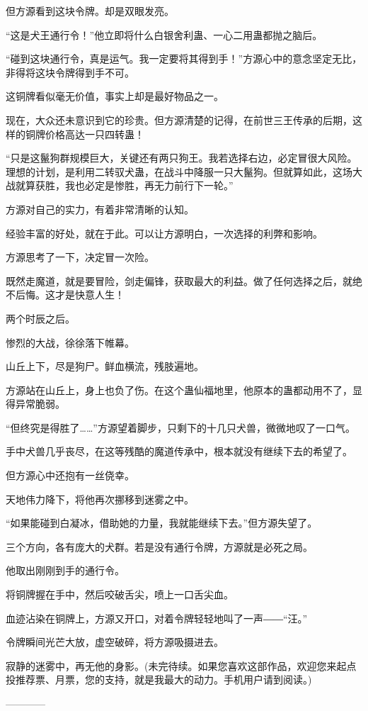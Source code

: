 \begin{this_body}
但方源看到这块令牌。却是双眼发亮。

“这是犬王通行令！”他立即将什么白银舍利蛊、一心二用蛊都抛之脑后。

“碰到这块通行令，真是运气。我一定要将其得到手！”方源心中的意念坚定无比，非得将这块令牌得到手不可。

这铜牌看似毫无价值，事实上却是最好物品之一。

现在，大众还未意识到它的珍贵。但方源清楚的记得，在前世三王传承的后期，这样的铜牌价格高达一只四转蛊！

“只是这鬣狗群规模巨大，关键还有两只狗王。我若选择右边，必定冒很大风险。理想的计划，是利用二转驭犬蛊，在战斗中降服一只大鬣狗。但就算如此，这场大战就算获胜，我也必定是惨胜，再无力前行下一轮。”

方源对自己的实力，有着非常清晰的认知。

经验丰富的好处，就在于此。可以让方源明白，一次选择的利弊和影响。

方源思考了一下，决定冒一次险。

既然走魔道，就是要冒险，剑走偏锋，获取最大的利益。做了任何选择之后，就绝不后悔。这才是快意人生！

两个时辰之后。

惨烈的大战，徐徐落下帷幕。

山丘上下，尽是狗尸。鲜血横流，残肢遍地。

方源站在山丘上，身上也负了伤。在这个蛊仙福地里，他原本的蛊都动用不了，显得异常脆弱。

“但终究是得胜了……”方源望着脚步，只剩下的十几只犬兽，微微地叹了一口气。

手中犬兽几乎丧尽，在这等残酷的魔道传承中，根本就没有继续下去的希望了。

但方源心中还抱有一丝侥幸。

天地伟力降下，将他再次挪移到迷雾之中。

“如果能碰到白凝冰，借助她的力量，我就能继续下去。”但方源失望了。

三个方向，各有庞大的犬群。若是没有通行令牌，方源就是必死之局。

他取出刚刚到手的通行令。

将铜牌握在手中，然后咬破舌尖，喷上一口舌尖血。

血迹沾染在铜牌上，方源又开口，对着令牌轻轻地叫了一声――“汪。”

令牌瞬间光芒大放，虚空破碎，将方源吸摄进去。

寂静的迷雾中，再无他的身影。(未完待续。如果您喜欢这部作品，欢迎您来起点投推荐票、月票，您的支持，就是我最大的动力。手机用户请到阅读。)

------------

\end{this_body}


